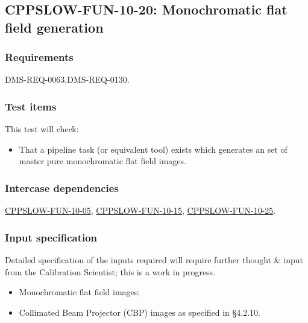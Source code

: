 \subsection{CPPSLOW-FUN-10-20: Monochromatic flat field generation}
\label{cppslow-fun-10-20}

\subsubsection{Requirements}

DMS-REQ-0063,DMS-REQ-0130.

\subsubsection{Test items}

This test will check:

\begin{itemize}

  \item{That a pipeline task (or equivalent tool) exists which generates an
  set of master pure monochromatic flat field images.}

\end{itemize}

\subsubsection{Intercase dependencies}

\hyperref[cppslow-fun-10-05]{CPPSLOW-FUN-10-05},
\hyperref[cppslow-fun-10-15]{CPPSLOW-FUN-10-15},
\hyperref[cppslow-fun-10-25]{CPPSLOW-FUN-10-25}.

\subsubsection{Input specification}

\begin{note}
Detailed specification of the inputs required will require further thought \&
input from the Calibration Scientist; this is a work in progress.
\end{note}

\begin{itemize}

  \item{Monochromatic flat field images;}
  \item{Collimated Beam Projector (CBP) images as specified in 
  \S4.2.10.}

\end{itemize}

